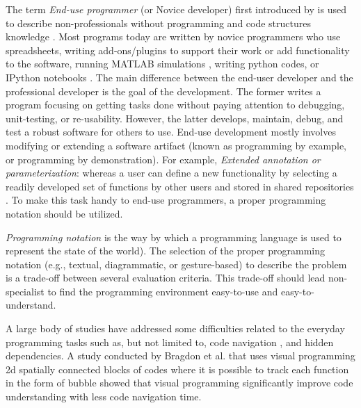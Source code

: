 \documentclass{scsSimAUDPaperFormat}
\begin{document}
The term \textit{End-use programmer} (or Novice developer) first introduced by \cite{Nardi1993AComputing} is used to describe non-professionals without programming and code structures knowledge \cite{InteractionDesignFoundation2014End-UserEd.}. Most programs today are written by novice programmers \cite{Rothermel2011TheEngineering} who use spreadsheets, writing add-ons/plugins to support their work or add functionality to the software, running MATLAB simulations \cite{Mathworks2016MATLABSimulink}, writing python codes, or IPython notebooks \cite{ScaffidiEstimatingProgrammers}. The main difference between the end-user developer and the professional developer is the goal of the development. The former writes a program focusing on getting tasks done without paying attention to debugging, unit-testing, or re-usability. However, the latter develops, maintain, debug, and test a robust software for others to use\cite{LiebermanEnd-userDevelopment}. End-use development mostly involves modifying or extending a software artifact (known as programming by example, or programming by demonstration). For example, \textit{Extended annotation or parameterization}: whereas a user can define a new functionality by selecting a readily developed set of functions by other users and stored in shared repositories \cite{Lieberman2006End-UserParadigm}. To make this task handy to end-use programmers, a proper programming notation should be utilized.

\textit{Programming notation} is the way by which a programming language is used to represent the state of the world\cite{Green2004InstructionsDescriptions}). The selection of the proper programming notation (e.g., textual, diagrammatic, or gesture-based) to describe the problem is a trade-off between several evaluation criteria\cite{Green2004InstructionsDescriptions}. This trade-off should lead non-specialist to find the programming environment easy-to-use and easy-to-understand. 

A large body of studies have addressed some difficulties related to the everyday programming tasks such as, but not limited to, code navigation \cite{DeLine2006CodeCode}, and hidden dependencies. A study conducted by Bragdon et al. \cite{Bragdon2010CodeMaintenance} that uses visual programming 2d spatially connected blocks of codes where it is possible to track each function in the form of bubble showed that visual programming significantly improve code understanding with less code navigation time.
\end{document}
